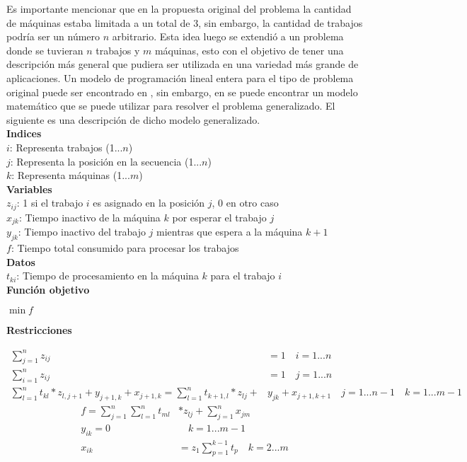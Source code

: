 \documentclass[10pt, twoside]{article}
\begin{document}
Es importante mencionar que en la propuesta original del problema la cantidad
de máquinas estaba limitada a un total de 3, sin embargo, la cantidad de trabajos
podría ser un número $n$ arbitrario. Esta idea luego se extendió a un problema
donde se tuvieran $n$ trabajos y $m$ máquinas, esto con el objetivo de tener una
descripción más general que pudiera ser utilizada en una variedad
más grande de aplicaciones. Un modelo de programación lineal entera para el tipo
de problema original puede ser encontrado en \cite{old_model}, sin embargo, en
\cite{model} se puede encontrar un modelo matemático que se puede utilizar para
resolver el problema generalizado. El siguiente es una descripción de dicho
modelo generalizado.\\

\noindent
\textbf{Indices}\\
$i$: Representa trabajos (1...$n$)\\
$j$: Representa la posición en la secuencia (1...$n$)\\
$k$: Representa máquinas (1...$m$)\\

\noindent
\textbf{Variables}\\
$z_{ij}$: 1 si el trabajo $i$ es asignado en la posición $j$, 0 en otro caso\\
$x_{jk}$: Tiempo inactivo de la máquina $k$ por esperar el trabajo $j$\\
$y_{jk}$: Tiempo inactivo del trabajo $j$ mientras que espera a la máquina $k+1$\\
$f$: Tiempo total consumido para procesar los trabajos\\

\noindent
\textbf{Datos}\\
$t_{ki}$: Tiempo de procesamiento en la máquina $k$ para el trabajo $i$\\

\noindent
\textbf{Función objetivo}
\begin{center}
$\min f$
\end{center}

\noindent
\textbf{Restricciones}

\begin{align}
    \label{eq_1} \sum_{j=1}^{n} z_{ij} &= 1 \quad i=1...n \\
    \label{eq_2} \sum_{i=1}^{n} z_{ij} &= 1 \quad j=1...n \\
    \label{eq_3} \sum_{l=1}^{n}t_{kl} * z_{l,j+1} + y_{j+1,k} + x_{j+1,k} = \sum_{l=1}^{n} t_{k+1,l} * z_{lj} + &y_{jk} + x_{j+1,k+1} \quad j=1...n-1 \quad k=1...m-1
\end{align}
\begin{align}
    \label{eq_4} f = \sum_{j=1}^{n} \sum_{l=1}^{n} t_{ml} &* z_{lj} + \sum_{j=1}^{n} x_{jm}\\
    \label{eq_5} y_{ik} = 0& \quad k=1...m-1\\
    \label{eq_6} x_{ik} &= z_1 \sum_{p=1}^{k-1} t_p \quad k=2...m
\end{align}
\end{document}
